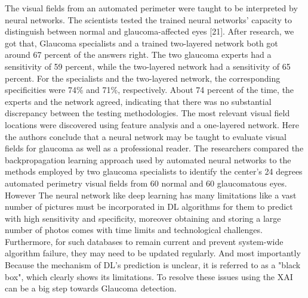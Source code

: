 \vspace{5mm}
\noindent The visual fields from an automated perimeter were taught to be interpreted by neural networks. The scientists tested the trained neural networks' capacity to distinguish between normal and glaucoma-affected eyes [21]. After research, we got that, Glaucoma specialists and a trained two-layered network both got around 67 percent of the answers right. The two glaucoma experts had a sensitivity of 59 percent, while the two-layered network had a sensitivity of 65 percent. For the specialists and the two-layered network, the corresponding specificities were 74\% and 71\%, respectively. About 74 percent of the time, the experts and the network agreed, indicating that there was no substantial discrepancy between the testing methodologies. The most relevant visual field locations were discovered using feature analysis and a one-layered network. Here the authors conclude that a neural network may be taught to evaluate visual fields for glaucoma as well as a professional reader. The researchers compared the backpropagation learning approach used by automated neural networks to the methods employed by two glaucoma specialists to identify the center’s 24 degrees automated perimetry visual fields from 60 normal and 60 glaucomatous eyes. However The neural network like deep learning has many limitations like a vast number of pictures must be incorporated in DL algorithms for them to predict with high sensitivity and specificity, moreover obtaining and storing a large number of photos comes with time limits and technological challenges. Furthermore, for such databases to remain current and prevent system-wide algorithm failure, they may need to be updated regularly. And most importantly Because the mechanism of DL's prediction is unclear, it is referred to as a "black box", which clearly shows its limitations. To resolve these issues using the XAI can be a big step towards Glaucoma detection.

